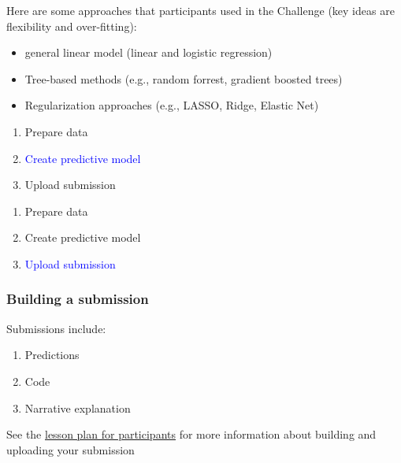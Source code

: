\documentclass[aspectratio=169]{beamer}
\begin{document}
\begin{frame}
Here are some approaches that participants used in the Challenge (key ideas are flexibility and over-fitting):

\begin{itemize}
\item general linear model (linear and logistic regression)
\item Tree-based methods (e.g., random forrest, gradient boosted trees)
\item Regularization approaches (e.g., LASSO, Ridge, Elastic Net)
\end{itemize}

\end{frame}
\begin{frame}

\begin{enumerate}
\item Prepare data
\item \textcolor{blue}{Create predictive model}
\item Upload submission
\end{enumerate}

\end{frame}
\begin{frame}

\begin{enumerate}
\item Prepare data
\item Create predictive model
\item \textcolor{blue}{Upload submission}
\end{enumerate}

\end{frame}
\begin{frame}
\frametitle{Building a submission}

Submissions include:
\begin{enumerate}
\item Predictions
\item Code
\item Narrative explanation
\end{enumerate}

\vfill
See the \href{https://github.com/compsocialscience/summer-institute/blob/master/2020/materials/day5-mass-collaboration/activity/lesson_plan_masscollaboration_participant.md}{lesson plan for participants} for more information about building and uploading your submission

\end{frame}
\end{document}
